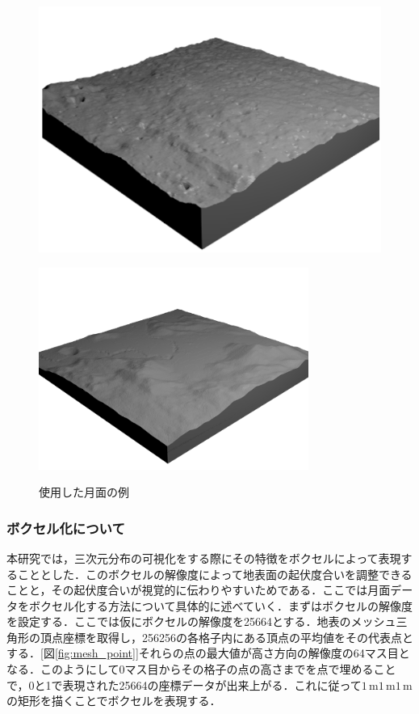 \documentclass[uplatex,twocolumn, dvipdfmx]{jsarticle}  %
\begin{document}
\begin{figure}[t]
  \centering
  \begin{minipage}[b]{0.48\linewidth}
    \centering
    \includegraphics[keepaspectratio, scale=0.15]{images/NASA_moon.png}
    \label{fig:NASA_moon}
  \end{minipage}
  \begin{minipage}[b]{0.48\linewidth}
    \centering
    \includegraphics[keepaspectratio, scale=0.3]{images/NASA_moon2.png}
    \label{fig:NASA_moon2}
  \end{minipage}
  \caption{使用した月面の例}\label{fig:NASA_moons}
\end{figure}



\subsubsection{ボクセル化について}
本研究では，三次元分布の可視化をする際にその特徴をボクセルによって表現することとした．このボクセルの解像度によって地表面の起伏度合いを調整できることと，その起伏度合いが視覚的に伝わりやすいためである．ここでは月面データをボクセル化する方法について具体的に述べていく．まずはボクセルの解像度を設定する．ここでは仮にボクセルの解像度を256\times64とする．地表のメッシュ三角形の頂点座標を取得し，256\times256の各格子内にある頂点の平均値をその代表点とする．[図\ref{fig:mesh_point}]それらの点の最大値が高さ方向の解像度の64マス目となる．このようにして0マス目からその格子の点の高さまでを点で埋めることで，0と1で表現された256\times64の座標データが出来上がる．これに従って$1\mathrm{\,m}$\times$1\mathrm{\,m}$\times$1\mathrm{\,m}$の矩形を描くことでボクセルを表現する．
\end{document}
